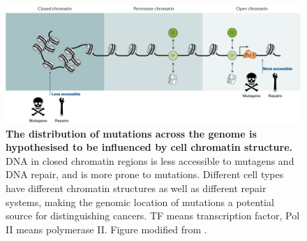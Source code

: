 \begin{figure}[ht!]
    \centering
    \includegraphics[scale=0.24]{graphics/chromatin_demo.png}
    \caption{\textbf{The distribution of mutations across the genome is hypothesised to be influenced by cell chromatin structure.} DNA in closed chromatin regions is less accessible to mutagens and DNA repair, and is more prone to mutations. Different cell types have different chromatin structures as well as different repair systems, making the genomic location of mutations a potential source for distinguishing cancers.  TF means transcription factor, Pol II means polymerase II. Figure modified from \citet{Klemm2019ChromatinEpigenome}.}
    \label{fig:chromatin_demo}
\end{figure}
